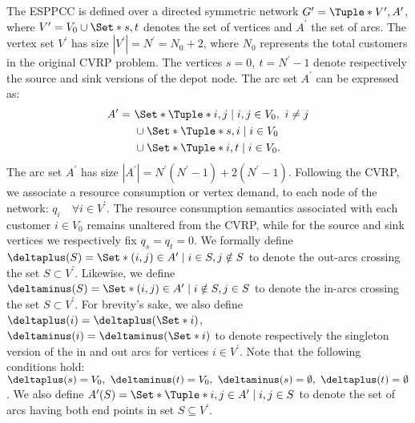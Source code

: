 The ESPPCC is defined over a directed symmetric network
$G^\prime = \Tuple*{V^\prime, A^\prime}$,
where $V^\prime = V_0 \cup \Set*{s, t}$ denotes the set of vertices and $A^\prime$ the set of arcs.
The vertex set $V^\prime$ has size $|V^\prime| = N^\prime = N_0 + 2$, where $N_0$ represents the total customers in the original CVRP problem.
The vertices $s = 0,\ t = N^\prime - 1$ denote respectively the source and sink versions of the depot node.
The arc set $A^\prime$ can be expressed as:
\begin{equation}
	\begin{aligned}
		A^\prime = \  & \Set*{\Tuple*{i, j} \mid i, j \in V_0,\ i \ne j} \\
		              & \cup \Set*{\Tuple*{s, i} \mid i \in V_0}         \\
		              & \cup \Set*{\Tuple*{i, t} \mid i \in V_0}.
	\end{aligned}
\end{equation}
The arc set $A^\prime$ has size $|A^\prime| = N^\prime(N^\prime - 1) + 2(N^\prime - 1)$.
Following the CVRP,
we associate a resource consumption or vertex demand,
to each node of the network: $q_i \quad \forall i \in V^\prime$.
The resource consumption semantics associated with each customer
$i \in V_0$ remains unaltered  from the CVRP, while for the source and sink vertices
we respectively fix $q_{s} = q_{t} = 0$.
We formally define $\deltaplus(S) = \Set*{(i, j) \in A^\prime \mid i \in S, j \notin S}$
to denote the out-arcs crossing the set $S \subset V^\prime$.
Likewise, we define $\deltaminus(S) = \Set*{(i, j) \in A^\prime \mid i \notin S, j \in S}$
to denote the in-arcs crossing the set $S \subset V^\prime$.
For brevity’s sake,
we also define $\deltaplus(i) = \deltaplus(\Set*{i})$, $\deltaminus(i) = \deltaminus(\Set*{i})$
to denote respectively the singleton version of the in and out arcs for vertices $i \in V^\prime$.
Note that the following conditions hold:
$\deltaplus(s) = V_0,\ \deltaminus(t) = V_0,\ \deltaminus(s) = \emptyset,\ \deltaplus(t) = \emptyset$.
We also define $A^\prime(S) = \Set*{\Tuple*{i, j} \in A^\prime \mid i, j \in S}$
to denote the set of arcs having both end points in set $S \subseteq V^\prime$.


